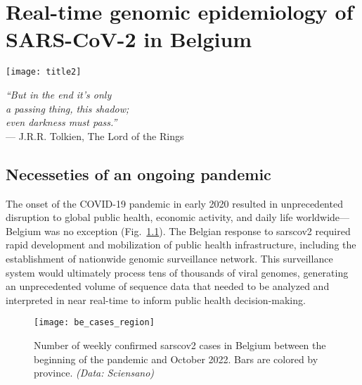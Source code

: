\chapter{Real-time genomic epidemiology of SARS-CoV-2 in Belgium}\label{ch:chapter1}

\begin{minipage}[b]{0.57\textwidth}
    \texttt{[image: title2]} %
  \end{minipage}
  \hfill
  \begin{minipage}[b]{0.35\textwidth}
    \footnotesize
    \begin{flushright}
      \textit{``But in the end it's only\\a passing thing, this shadow;\\even darkness must pass.''} \\
      --- J.R.R.
Tolkien, The Lord of the Rings
    \end{flushright}
    \vspace{2cm}
\end{minipage}
  
\clearpage

\onehalfspacing

\section{Necesseties of an ongoing pandemic}
The onset of the COVID-19 pandemic in early 2020 resulted in unprecedented disruption to global public health, economic activity, and daily life worldwide---Belgium was no exception (Fig.~\ref{fig:beCaseCountsRegion}).
The Belgian response to \gls{sarscov2} required rapid development and mobilization of public health infrastructure, including the establishment of nationwide genomic surveillance network.
This surveillance system would ultimately process tens of thousands of viral genomes, generating an unprecedented volume of sequence data that needed to be analyzed and interpreted in near real-time to inform public health decision-making.

\begin{figure}[ht]
  \centering
  \texttt{[image: be\_cases\_region]}
  \caption[COVID-19 cases in Belgum by province]{Number of weekly confirmed \gls{sarscov2} cases in Belgium between the beginning of the pandemic and October 2022. Bars are colored by province. \textit{(Data: Sciensano)}}
  \label{fig:beCaseCountsRegion}
\end{figure}

